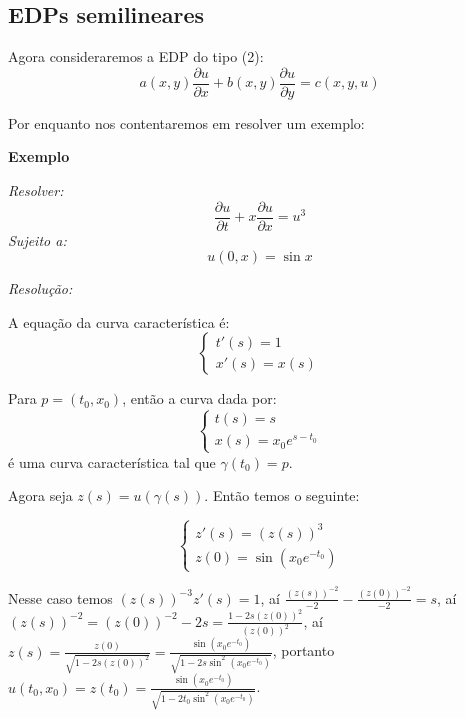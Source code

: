 \documentclass[11pt,twoside,a4paper]{book}
\begin{document}
\subsection{EDPs semilineares}

Agora consideraremos a EDP do tipo (2):
\begin{equation*}
    a(x,y)\frac{\partial u}{\partial x}+b(x,y)\frac{\partial u}{\partial y}=c(x,y,u)
\end{equation*}

\medskip
\noindent
Por enquanto nos contentaremos em resolver um exemplo:

\bigskip
\noindent
\textbf{Exemplo}

\bigskip
\noindent
\textit{Resolver:}
\begin{equation*}
    \frac{\partial u}{\partial t}+x\frac{\partial u}{\partial x}=u^3
\end{equation*}
\textit{Sujeito a:}
\begin{equation*}
    u(0,x)=\sin x
\end{equation*}

\smallskip
\noindent
\textit{Resolução:}

\noindent
A equação da curva característica é:
\begin{equation*}
    \begin{cases}
    t'(s)=1 \\
    x'(s)=x(s)
    \end{cases}
\end{equation*}

\noindent
Para $p=(t_0,x_0)$, então a curva dada por:
\begin{equation*}
    \begin{cases}
    t(s)=s \\
    x(s)=x_0e^{s-t_0}
    \end{cases}
\end{equation*}
é uma curva característica tal que $\gamma(t_0)=p$.

\smallskip
\noindent
Agora seja $z(s)=u(\gamma(s))$. Então temos o seguinte:

\begin{equation*}
    \begin{cases}
    z'(s)=(z(s))^3 \\
    z(0)=\sin(x_0e^{-t_0})
    \end{cases}
\end{equation*}

\smallskip
\noindent
Nesse caso temos $(z(s))^{-3}z'(s)=1$, aí $\frac{(z(s))^{-2}}{-2}-\frac{(z(0))^{-2}}{-2}=s$, aí $(z(s))^{-2}=(z(0))^{-2}-2s=\frac{1-2s(z(0))^2}{(z(0))^2}$, aí $z(s)=\frac{z(0)}{\sqrt{1-2s(z(0))^2}}=\frac{\sin(x_0e^{-t_0})}{\sqrt{1-2s\sin^2(x_0e^{-t_0})}}$, portanto $u(t_0,x_0)=z(t_0)=\frac{\sin(x_0e^{-t_0})}{\sqrt{1-2t_0\sin^2(x_0e^{-t_0})}}$.
\end{document}
